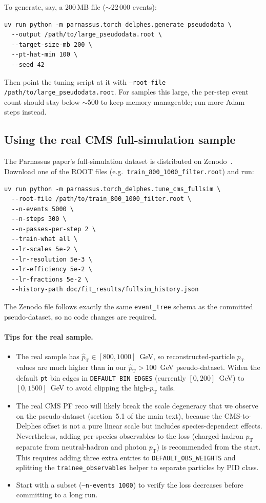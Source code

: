 \documentclass[a4paper,11pt]{article}
\begin{document}
To generate, say, a 200\,MB file ($\sim$22\,000 events):

\begin{verbatim}
uv run python -m parnassus.torch_delphes.generate_pseudodata \
  --output /path/to/large_pseudodata.root \
  --target-size-mb 200 \
  --pt-hat-min 100 \
  --seed 42
\end{verbatim}

Then point the tuning script at it with \texttt{--root-file
/path/to/large\_pseudodata.root}. For samples this large, the
per-step event count should stay below $\sim$500 to keep memory
manageable; run more Adam steps instead.

\subsection{Using the real CMS full-simulation sample}

The Parnassus paper's full-simulation dataset is distributed on
Zenodo~\cite{parnassus_zenodo}. Download one of the ROOT files
(e.g.\ \texttt{train\_800\_1000\_filter.root}) and run:

\begin{verbatim}
uv run python -m parnassus.torch_delphes.tune_cms_fullsim \
  --root-file /path/to/train_800_1000_filter.root \
  --n-events 5000 \
  --n-steps 300 \
  --n-passes-per-step 2 \
  --train-what all \
  --lr-scales 5e-2 \
  --lr-resolution 5e-3 \
  --lr-efficiency 5e-2 \
  --lr-fractions 5e-2 \
  --history-path doc/fit_results/fullsim_history.json
\end{verbatim}

The Zenodo file follows exactly the same \texttt{event\_tree} schema
as the committed pseudo-dataset, so no code changes are required.

\paragraph{Tips for the real sample.}
\begin{itemize}
\item The real sample has $\hat{p}_\mathrm{T}\in[800,1000]$~GeV, so
  reconstructed-particle $p_\mathrm{T}$ values are much higher than
  in our $\hat{p}_\mathrm{T}>100$~GeV pseudo-dataset. Widen the
  default \texttt{pt} bin edges in \texttt{DEFAULT\_BIN\_EDGES}
  (currently $[0,200]$~GeV) to $[0,1500]$~GeV to avoid clipping the
  high-$p_\mathrm{T}$ tails.
\item The real CMS PF reco will likely break the scale degeneracy
  that we observe on the pseudo-dataset (section~5.1 of the main
  text), because the CMS-to-Delphes offset is not a pure linear
  scale but includes species-dependent effects. Nevertheless, adding
  per-species observables to the loss (charged-hadron $p_\mathrm{T}$
  separate from neutral-hadron and photon $p_\mathrm{T}$) is
  recommended from the start. This requires adding three extra
  entries to \texttt{DEFAULT\_OBS\_WEIGHTS} and splitting the
  \texttt{trainee\_observables} helper to separate particles by
  PID class.
\item Start with a subset (\texttt{--n-events 1000}) to verify the
  loss decreases before committing to a long run.
\end{itemize}
\end{document}
